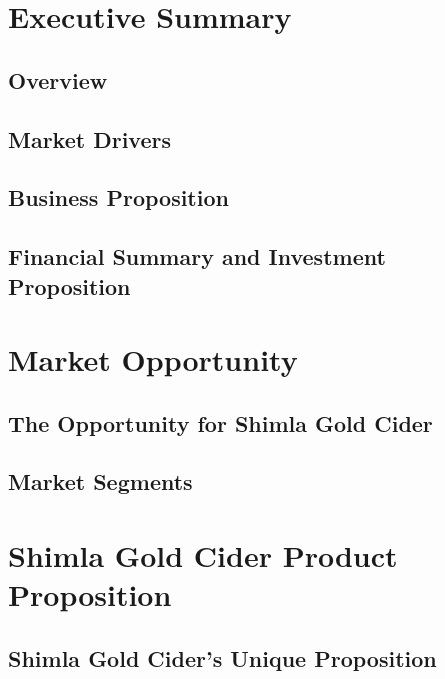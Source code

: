 \documentclass[11pt]{article}
\begin{document}
\section{Executive Summary}
  \subsection{Overview}
  \subsection{Market Drivers}
  \subsection{Business Proposition}
  \subsection{Financial Summary and Investment Proposition}
\section{Market Opportunity}
  \subsection{The Opportunity for Shimla Gold Cider}
  \subsection{Market Segments}
\section{Shimla Gold Cider Product Proposition}
  \subsection{Shimla Gold Cider's Unique Proposition}
\end{document}
